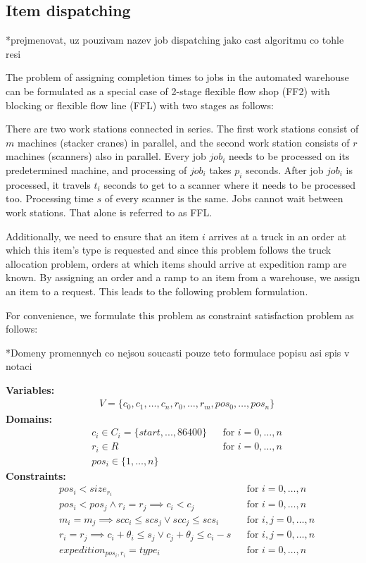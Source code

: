 \documentclass{ctuthesis}
\begin{document}
 
\subsection{Item dispatching}*prejmenovat, uz pouzivam nazev job dispatching jako cast algoritmu co tohle resi
\label{subsec:expeditiondispatching}

The problem of assigning completion times to jobs in the automated warehouse can be formulated as a special case of 2-stage flexible flow shop (FF2) with blocking or flexible flow line (FFL) with two stages as follows:

There are two work stations connected in series. The first work stations consist of $m$ machines (stacker cranes) in parallel, and the second work station consists of $r$ machines (scanners) also in parallel. Every job $job_i$ needs to be processed on its predetermined machine, and processing of $job_i$ takes $p_i$ seconds. After job $job_i$ is processed, it travels $t_i$ seconds to get to a scanner where it needs to be processed too. Processing time $s$ of every scanner is the same. Jobs cannot wait between work stations. That alone is referred to as FFL.

Additionally, we need to ensure that an item $i$ arrives at a truck in an order at which this item's type is requested and since this problem follows the truck allocation problem, orders at which items should arrive at expedition ramp are known. By assigning an order and a ramp to an item from a warehouse, we assign an item to a request. This leads to the following problem formulation.

For convenience, we formulate this problem as constraint satisfaction problem as follows:

*Domeny promennych co nejsou soucasti pouze teto formulace popisu asi spis v notaci

\textbf{Variables:}
\begin{align}
    &V = \{c_{0}, c_{1}, \ldots, c_{n},r_0, \ldots, r_m, pos_0, \ldots, pos_n\}
\end{align}
\textbf{Domains:}
\begin{align}
&c_{i} \in C_i = \{start, ..., 86400\} && \text{for } i=0,\ldots,n\\
&r_{i} \in R && \text{for } i=0,\ldots,n\\
&pos_i \in \{1, \ldots, n\}
\end{align}
\textbf{Constraints:}
 \begin{align}
& pos_i < size_{r_i} && \text{for } i=0,\ldots,n \nonumber \\
& pos_i < pos_j \land r_i = r_j \implies c_i < c_j && \text{for } i=0,\ldots,n\\ \label{eq:idcons2}
& m_i = m_j \implies scc_i \leq scs_j \lor scc_j \leq scs_i && \text{for } i,j=0,\ldots,n\\ \label{eq:idcons1}
& r_i = r_j \implies c_i  + \theta_i \leq s_j \lor c_j + \theta_j \leq c_i - s && \text{for } i,j=0,\ldots,n\\ \label{eq:idcons4}
& expedition_{pos_i,r_i} = type_i  && \text{for } i=0,\ldots,n\\ \label{eq:idcons3}
\end{align}
\end{document}
